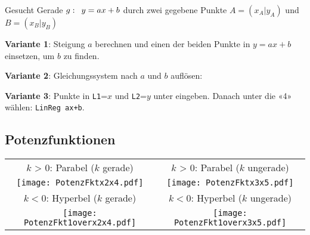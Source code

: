 \begin{multicols}{2}
Gesucht Gerade $g\-: \,\,\, y=ax+b$ durch zwei gegebene Punkte $A=(x_A|y_A)$ und $B=(x_B|y_B)$

\textbf{Variante 1}: Steigung $a$ berechnen und einen der beiden Punkte in
$y=ax+b$ einsetzen, um $b$ zu finden.

\textbf{Variante 2}: Gleichungssystem nach $a$ und $b$ auf\/lösen:

\textbf{Variante 3}: Punkte in \texttt{L1}=$x$ und \texttt{L2}=$y$
unter  eingeben. Danach unter
 die «4» wählen:
\texttt{LinReg ax+b}.

\end{multicols}

\newpage
\headerUndFooterDieseSeite{}

\subsection*{Potenzfunktionen}

\begin{tabular}{cc}
$k$ > 0: Parabel ($k$ gerade) & $k$ > 0: Parabel ($k$ ungerade)\\   %
  \texttt{[image: PotenzFktx2x4.pdf]} &
  \texttt{[image: PotenzFktx3x5.pdf]}\\

$k<0$: Hyperbel  ($k$ gerade) & $k<0$: Hyperbel ($k$ ungerade)\\
  \texttt{[image: PotenzFkt1overx2x4.pdf]}&
  \texttt{[image: PotenzFkt1overx3x5.pdf]}
  \end{tabular}


